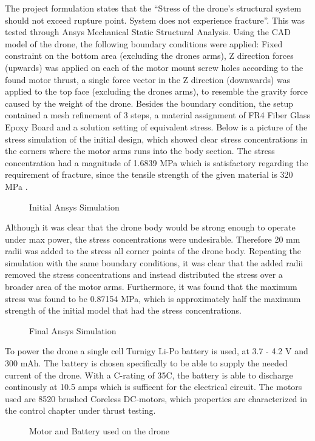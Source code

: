 The project formulation states that the “Stress of the drone’s structural system should not exceed rupture point. System does not experience fracture”. This was tested through Ansys Mechanical Static Structural Analysis. Using the CAD model of the drone, the following boundary conditions were applied: Fixed constraint on the bottom area (excluding the drones arms), Z direction forces (upwards) was applied on each of the motor mount screw holes according to the found motor thrust, a single force vector in the Z direction (downwards) was applied to the top face (excluding the drones arms), to resemble the gravity force caused by the weight of the drone. Besides the boundary condition, the setup contained a mesh refinement of 3 steps, a material assignment of FR4 Fiber Glass Epoxy Board and a solution setting of equivalent stress. Below is a picture of the stress simulation of the initial design, which showed clear stress concentrations in the corners where the motor arms runs into the body section. The stress concentration had a magnitude of 1.6839 MPa which is satisfactory regarding the requirement of fracture, since the tensile strength of the given material is 320 MPa \cite{FR4}. 

\begin{figure}[H]%
    \centering
    \caption{Initial Ansys Simulation}%
    \label{fig:example}%
\end{figure}

Although it was clear that the drone body would be strong enough to operate under max power, the stress concentrations were undesirable. Therefore 20 mm radii was added to the stress all corner points of the drone body. Repeating the simulation with the same boundary conditions, it was clear that the added radii removed the stress concentrations and instead distributed the stress over a broader area of the motor arms. Furthermore, it was found that the maximum stress was found to be 0.87154 MPa, which is approximately half the maximum strength of the initial model that had the stress concentrations.

\begin{figure}[H]%
    \centering
    \caption{Final Ansys Simulation}%
    \label{fig:example}%
\end{figure}

To power the drone a single cell Turnigy Li-Po battery is used, at 3.7 - 4.2 V and 300 mAh. The battery is chosen specifically to be able to supply the needed current of the drone. With a C-rating of 35C, the battery is able to discharge continously at 10.5 amps which is sufficent for the electrical circuit. The motors used are 8520 brushed Coreless DC-motors, which properties are characterized in the control chapter under thrust testing. 

\begin{figure}[H]%
    \centering
    \qquad
    \caption{Motor and Battery used on the drone}%
    \label{fig:example}%
\end{figure}
